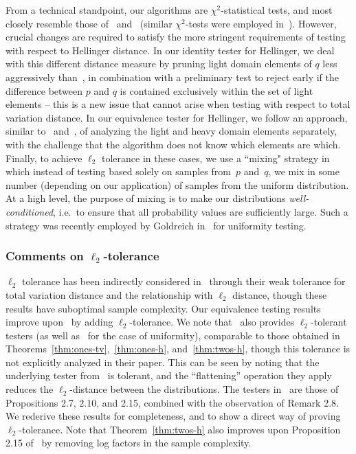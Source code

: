 From a technical standpoint, our algorithms are $\chi^2$-statistical tests, and most closely resemble those of~\cite{AcharyaDK15} and~\cite{ChanDVV14} (similar $\chi^2$-tests were employed in~\cite{ValiantV17, DiakonikolasKN15a, CanonneDGR16}).
However, crucial changes are required to satisfy the more stringent requirements of testing with respect to Hellinger distance.
In our identity tester for Hellinger, we deal with this different distance measure by pruning light domain elements of $q$ less aggressively than~\cite{AcharyaDK15},
in combination with a preliminary test to reject early if the difference between $p$ and $q$ is contained exclusively within the set of light elements -- this is a new issue that cannot arise when testing with respect to total variation distance.
In our equivalence tester for Hellinger, we follow an approach, similar to~\cite{ChanDVV14} and~\cite{DiakonikolasK16},
of analyzing the light and heavy domain elements separately, with the challenge that the algorithm does not know which elements are which.
Finally, to achieve $\ell_2$ tolerance in these cases, we use a ``mixing" strategy
in which instead of testing based solely on samples from~$p$ and~$q$, we mix in some number (depending on our application) of samples from the uniform distribution.
At a high level, the purpose of mixing is to make our distributions \emph{well-conditioned},
i.e.\ to ensure that all probability values are sufficiently large.
Such a strategy was recently employed by Goldreich in~\cite{Goldreich16} for uniformity testing.

\subsubsection{Comments on $\ell_2$-tolerance}
$\ell_2$ tolerance has been indirectly considered in~\cite{GoldreichR00, BatuFFKRW01, BatuFRSW13} through their weak tolerance for total variation distance and the relationship with $\ell_2$ distance, though these results have suboptimal sample complexity.
Our equivalence testing results improve upon~\cite{ChanDVV14} by adding $\ell_2$-tolerance.
We note that~\cite{DiakonikolasK16} also provides $\ell_2$-tolerant testers (as well as~\cite{DiakonikolasKN15a} for the case of uniformity), comparable to those obtained in Theorems~\ref{thm:ones-tv},~\ref{thm:ones-h}, and~\ref{thm:twos-h}, though this tolerance is not explicitly analyzed in their paper.
This can be seen by noting that the underlying tester from~\cite{ChanDVV14} is tolerant, and the ``flattening'' operation they apply reduces the $\ell_2$-distance between the distributions.
The testers in~\cite{DiakonikolasK16} are those of Propositions 2.7, 2.10, and 2.15, combined with the observation of Remark 2.8.
We rederive these results for completeness, and to show a direct way of proving $\ell_2$-tolerance.
Note that Theorem~\ref{thm:twos-h} also improves upon Proposition 2.15 of~\cite{DiakonikolasK16} by removing log factors in the sample complexity.

